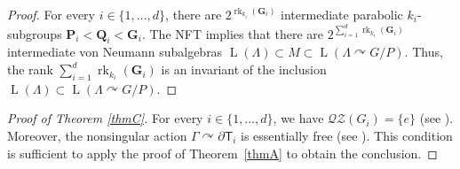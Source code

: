 \documentclass[11pt]{article}
\newcommand{\bG}{\boldsymbol{G}}
\newcommand{\bP}{\boldsymbol{P}}
\newcommand{\bQ}{\boldsymbol{Q}}
\theoremstyle{definition}
\DeclareMathOperator{\rk}{rk}
\DeclareMathOperator{\rL}{L}
\begin{document}
\begin{proof}
For every $i \in \{1, \dots, d\}$, there are $2^{\rk_{k_i}(\bG_i)}$ intermediate parabolic $k_i$-subgroups $\bP_i < \bQ_i < \bG_i$. The NFT implies that there are $2^{\sum_{i = 1}^d \rk_{k_i}(\bG_i)}$ intermediate von Neumann subalgebras $\rL(\Lambda) \subset M \subset \rL(\Lambda \curvearrowright G/P)$. Thus, the rank $\sum_{i = 1}^d \rk_{k_i}(\bG_i)$ is an invariant of the inclusion $\rL(\Lambda) \subset \rL(\Lambda \curvearrowright G/P)$.
\end{proof}

\begin{proof}[Proof of Theorem \ref{thmC}]
For every $i \in \{1, \dots, d\}$, we have $\mathscr{Q}\mathscr{Z}(G_i) = \{e\}$ (see \cite[Lem.\,3.1.1 \& Prop.\,3.1.2]{BM00a}). Moreover, the nonsingular action $\Gamma \curvearrowright \partial \mathsf T_i$ is essentially free (see \cite[Prop.\,6.4]{BBHP20}). This condition is sufficient to apply the proof of Theorem~\ref{thmA} to obtain the conclusion.
\end{proof}

\end{document}
